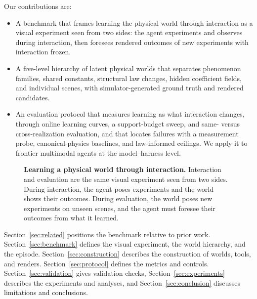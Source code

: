 Our contributions are:
\begin{itemize}
  \item A benchmark that frames learning the physical world through interaction as a visual experiment seen from two sides: the agent experiments and observes during interaction, then foresees rendered outcomes of new experiments with interaction frozen.
  \item A five-level hierarchy of latent physical worlds that separates phenomenon families, shared constants, structural law changes, hidden coefficient fields, and individual scenes, with simulator-generated ground truth and rendered candidates. 
  \item An evaluation protocol that measures learning as what interaction changes, through online learning curves, a support-budget sweep, and same- versus cross-realization evaluation, and that locates failures with a measurement probe, canonical-physics baselines, and law-informed ceilings. We apply it to frontier multimodal agents at the model--harness level. 
\end{itemize}

\begin{figure}[t]
  \centering
  \caption{\textbf{Learning a physical world through interaction.} Interaction and evaluation are the same visual experiment seen from two sides. During interaction, the agent poses experiments and the world shows their outcomes. During evaluation, the world poses new experiments on unseen scenes, and the agent must foresee their outcomes from what it learned.}
  \label{fig:hero}
\end{figure}

Section~\ref{sec:related} positions the benchmark relative to prior work. Section~\ref{sec:benchmark} defines the visual experiment, the world hierarchy, and the episode. Section~\ref{sec:construction} describes the construction of worlds, tools, and renders. Section~\ref{sec:protocol} defines the metrics and controls. Section~\ref{sec:validation} gives validation checks, Section~\ref{sec:experiments} describes the experiments and analyses, and Section~\ref{sec:conclusion} discusses limitations and conclusions.
